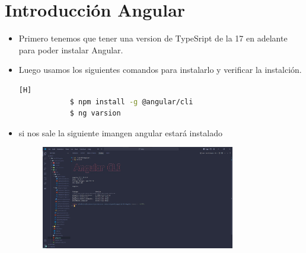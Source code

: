 \documentclass{article}
\begin{document}
	\section{Introducción Angular}
	\begin{itemize}
		\item Primero tenemos que tener una version de TypeSript de la 17 en adelante para poder instalar Angular.
		\item Luego usamos los siguientes comandos para instalarlo y verificar la instalción.
		\begin{lstlisting}[language=bash,caption={Comandos para instalar Angular}][H]
			$ npm install -g @angular/cli
			$ ng varsion
		\end{lstlisting}
		\item si nos sale la siguiente imangen angular estará instalado
		\begin{figure}[H]
			\centering
			\includegraphics[width=0.8\textwidth,keepaspectratio]{img/instalamosANgular.jpg}
	

\end{figure}
\end{itemize}
\end{document}
